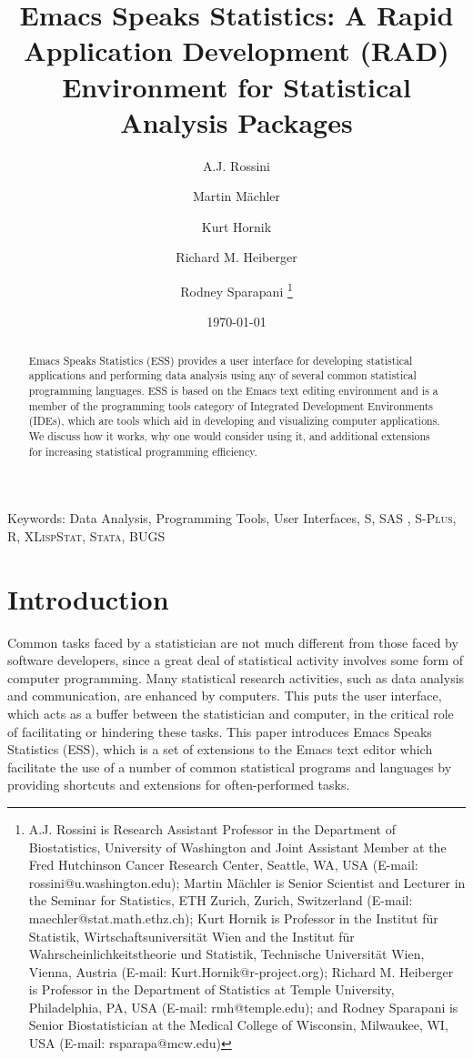 \documentclass{article}
\title{Emacs Speaks Statistics:  A Rapid Application Development (RAD)
  Environment for Statistical Analysis Packages}
\author{A.J. Rossini \and Martin M{\"a}chler \and Kurt Hornik \and Richard
  M. Heiberger \and Rodney Sparapani \footnote{%
    A.J. Rossini is Research Assistant Professor in the Department of
    Biostatistics, University of Washington and Joint Assistant Member at
    the Fred Hutchinson Cancer Research Center, Seattle, WA, USA
    (E-mail: rossini@u.washington.edu);
    Martin M{\"a}chler is Senior Scientist and Lecturer in the Seminar for
    Statistics, ETH Zurich, Zurich, Switzerland
    (E-mail: maechler@stat.math.ethz.ch);
    Kurt Hornik is Professor in the Institut f{\"u}r Statistik,
    Wirtschaftsuniversit{\"a}t Wien and the Institut f{\"u}r
    Wahrscheinlichkeitstheorie und Statistik, Technische Universit{\"a}t
    Wien, Vienna, Austria (E-mail: Kurt.Hornik@r-project.org);
    Richard M. Heiberger is Professor in the Department of Statistics at
    Temple University, Philadelphia, PA, USA (E-mail: rmh@temple.edu);
    and Rodney Sparapani is Senior Biostatistician at the Medical College
    of Wisconsin, Milwaukee, WI, USA (E-mail: rsparapa@mcw.edu)}}
\date{\today}
\newcommand*{\SAS}{\textsc{SAS}{\textregistered} }
\newcommand*{\Splus}{\textsc{S-Plus}}
\newcommand*{\XLispStat}{\textsc{XLispStat}}
\newcommand*{\Stata}{\textsc{Stata}}
\begin{document}
\maketitle

\begin{abstract}
  Emacs Speaks Statistics (ESS) provides a user interface for
  developing statistical applications and performing data analysis
  using any of several common statistical programming languages.  ESS
  is based on the Emacs text editing environment and is a member of
  the programming tools category of Integrated Development
  Environments (IDEs), which are tools which aid in developing and
  visualizing computer applications.  We discuss how it works, why one
  would consider using it, and additional extensions for increasing
  statistical programming efficiency.
\end{abstract}

\noindent Keywords: Data Analysis, Programming Tools, User Interfaces, S, \SAS,
\Splus, R, \XLispStat, \Stata, BUGS

\baselineskip=2pc

\section{Introduction}
\label{sec:introduction}

Common tasks faced by a statistician are not much different from those
faced by software developers, since a great deal of statistical
activity involves some form of computer programming.  Many
statistical research activities, such as data analysis and
communication, are enhanced by computers.  This puts the user
interface, which acts as a buffer between the statistician and
computer, in the critical role of facilitating or hindering these
tasks.  This paper introduces Emacs Speaks Statistics (ESS),
which is a set of extensions to the Emacs text editor which facilitate
the use of a number of common statistical programs and languages by
providing shortcuts and extensions for often-performed tasks.

\end{document}
